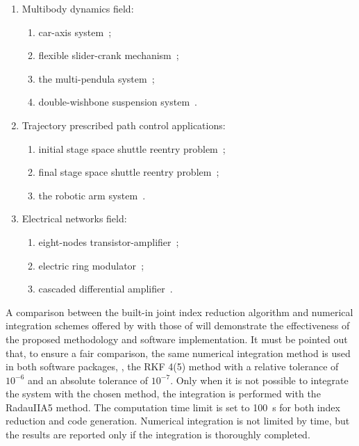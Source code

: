 \begin{enumerate}
  \setlength\itemsep{0.0em}
  \item Multibody dynamics field:
  \begin{enumerate}
    \setlength\itemsep{0.0em}
    \item car-axis system~\cite{lioen1998test, mazzia2008test};
    \item flexible slider-crank mechanism~\cite{lioen1998test, mazzia2008test};
    \item the multi-pendula system~\cite{nedialkov2008solvingIII};
    \item double-wishbone suspension system~\cite{lioen1998test, mazzia2008test}.
  \end{enumerate}
  \item Trajectory prescribed path control applications:
  \begin{enumerate}
    \setlength\itemsep{0.0em}
    \item initial stage space shuttle reentry problem~\cite{brenan1995numerical};
    \item final stage space shuttle reentry problem~\cite{brenan1995numerical};
    \item the robotic arm system~\cite{pryce1998solving}.
  \end{enumerate}
  \item Electrical networks field:
  \begin{enumerate}
    \setlength\itemsep{0.0em}
    \item eight-nodes transistor-amplifier~\cite{lioen1998test, mazzia2008test};
    \item electric ring modulator~\cite{lioen1998test, mazzia2008test};
    \item cascaded differential amplifier~\cite{brenan1995numerical}.
  \end{enumerate}
\end{enumerate}

A comparison between the built-in joint index reduction algorithm and numerical integration schemes offered by \Maple{} with those of \Indigo{} will demonstrate the effectiveness of the proposed methodology and software implementation. It must be pointed out that, to ensure a fair comparison, the same numerical integration method is used in both software packages, \ie{}, the \ac{RKF} 4(5) method with a relative tolerance of $10^{-6}$ and an absolute tolerance of $10^{-7}$. Only when it is not possible to integrate the system with the chosen method, the integration is performed with the RadauIIA5 method. The computation time limit is set to \SI{100}{\second} for both index reduction and code generation. Numerical integration is not limited by time, but the results are reported only if the integration is thoroughly completed.

